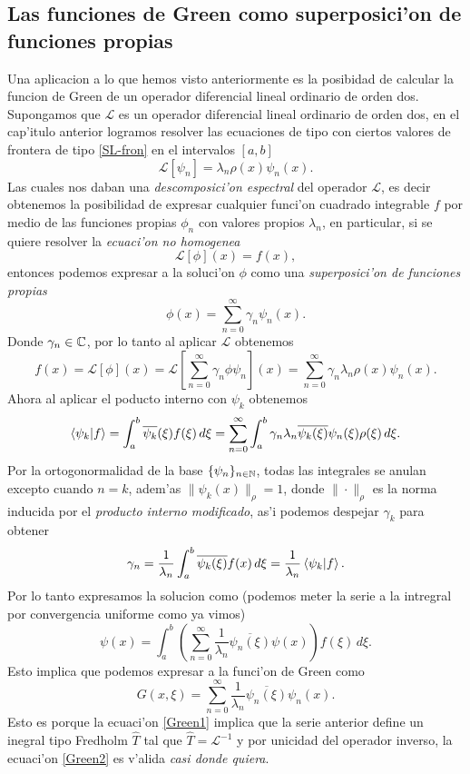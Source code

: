 \documentclass[main.tex]{subfiles}
\begin{document}
\subsection{Las funciones de Green como superposici'on de funciones propias}
\noindent Una aplicacion a lo que hemos visto anteriormente es la posibidad de calcular la funcion de Green de un operador diferencial lineal ordinario de orden dos. Supongamos que $\mathcal{L}$ es un operador diferencial lineal ordinario de orden dos,
en el cap'itulo anterior logramos resolver las ecuaciones de tipo con ciertos valores de frontera de tipo \ref{SL-fron} en el intervalos $[a,b]$
\[
  \mathcal{L}[\psi_{n}]=\lambda_{n}\rho(x)\psi_{n}(x).
\]
Las cuales nos daban una \emph{descomposici'on espectral} del operador $\mathcal{L}$, es decir obtenemos la posibilidad de expresar cualquier funci'on cuadrado integrable $f$ por medio de las funciones propias $\phi_{n}$ con valores propios $\lambda_{n}$, en particular, si se quiere resolver la \emph{ecuaci'on no homogenea}
\[
  \mathcal{L}[\phi](x)=f(x),
\]
entonces podemos expresar a la soluci'on $\phi$ como una \emph{superposici'on de funciones propias}
\[
  \phi(x)=\sum_{n=0}^{\infty}\gamma_{n}\psi_{n}(x).
\]
Donde $\gamma_{n}\in\mathbb C $, por lo tanto al aplicar $\mathcal{L}$ obtenemos
\[
  f(x)=\mathcal{L}[\phi](x)=\mathcal{L}\left[\sum_{n=0}^{\infty}\gamma_{n}\phi\psi_{n}\right](x)=
  \sum_{n=0}^{\infty}\gamma_{n}\lambda_{n}\rho(x)\psi_{n}(x).
\]
Ahora al aplicar el poducto interno con $\psi_{k}$ obtenemos
\[
  \braket{\psi_{k}|f}=\int_{a}^{b}\overline{\psi_{k}}(\xi)f(\xi)\,d\xi=
  \sum_{n=0}^{\infty}\int_{a}^{b}\gamma_{n}\lambda_{n}\overline{\psi_{k}(\xi)}\psi_{n}(\xi)\rho(\xi)\,d\xi.
\]
Por la ortogonormalidad de la base $\{\psi_{n}\}_{n\in \mathbb N }$, todas las integrales se anulan excepto cuando $n=k$, adem'as $\|\psi_{k}(x)\|_{\rho}=1$, donde $\|\cdot\|_{\rho}$ es la norma inducida por el \emph{producto interno modificado}, as'i podemos despejar $\gamma_{k}$ para obtener
\[
    \gamma_{n}=\frac{1}{\lambda_{n}}\int_{a}^{b}\overline{\psi_{k}(\xi)}f(x)\,d\xi=\frac{1}{\lambda_{n}}\braket{\psi_{k}|f}.
\]
Por lo tanto expresamos la solucion como (podemos meter la serie a la intregral por convergencia uniforme como ya vimos)
\begin{equation}\label{Green1}
  \psi(x)=\int_{a}^{b}\left(\sum_{n=0}^{\infty}\frac{1}{\lambda_{n}}\overline{\psi_{n}(\xi)}\psi(x)\right)f(\xi)\,d\xi.
\end{equation}
Esto implica que podemos expresar a la funci'on de Green como
\begin{equation}\label{Green2}
  G(x,\xi)=\sum_{n=0}^{\infty}\frac{1}{\lambda_{n}}\overline{\psi_{n}(\xi)}\psi_{n}(x).
\end{equation}
Esto es porque la ecuaci'on \ref{Green1} implica que la serie anterior define un inegral tipo Fredholm $\hat{T}$ tal que $\hat{T}=\mathcal{L}^{-1}$ y por unicidad del operador inverso, la ecuaci'on \ref{Green2} es v'alida \emph{casi donde quiera}.
\end{document}
